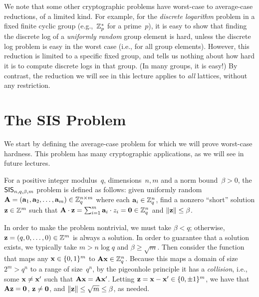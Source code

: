 \documentclass[11pt]{article}
\begin{document}
We note that some other cryptographic problems have worst-case to
average-case reductions, of a limited kind. For example, for the
\emph{discrete logarithm} problem in a fixed finite cyclic group
(e.g.,~$\mathbb{Z}_{p}^{*}$ for a prime~$p$), it is easy to show that finding
the discrete log of a \emph{uniformly random} group element is hard,
unless the discrete log problem is easy in the worst case (i.e., for
all group elements). However, this reduction is limited to a specific
fixed group, and tells us nothing about how hard it is to compute
discrete logs in that group. (In many groups, it is easy!) By
contrast, the reduction we will see in this lecture applies to
\emph{all} lattices, without any restriction.

\section{The SIS Problem}
\label{sec:sis-problem}

We start by defining the average-case problem for which we will prove
worst-case hardness. This problem has many cryptographic applications,
as we will see in future lectures.

\begin{definition}
  \label{def:sis-problem}
  For a positive integer modulus~$q$, dimensions~$n,m$ and a norm
  bound~$\beta > 0$, the $\mathsf{SIS}_{n,q,\beta,m}$ problem is defined as
  follows: given uniformly random
  $\mathbf{A} = (\mathbf{a}_{1}, \mathbf{a}_{2}, \ldots, \mathbf{a}_{m}) \in \mathbb{Z}_q^{n \times
    m}$ where each $\mathbf{a}_{i} \in \mathbb{Z}_q^{n}$, find a nonzero ``short''
  solution $\mathbf{z} \in \mathbb{Z}^{m}$ such that
  $\mathbf{A} \cdot \mathbf{z} = \sum_{i=1}^{m} \mathbf{a}_{i} \cdot z_{i} = \mathbf{0}
  \in \mathbb{Z}_q^{n}$ and $\lVert\mathbf{z}\rVert \leq \beta$.
\end{definition}

In order to make the problem nontrivial, we must take $\beta < q$;
otherwise, $\mathbf{z} = (q, 0, \ldots, 0) \in \mathbb{Z}^{m}$ is always a
solution. In order to guarantee that a solution exists, we typically
take $m > n \log q$ and $\beta \geq \sqrt{m}$. Then consider the
function that maps any $\mathbf{x} \in \{0,1\}^{m}$ to
$\mathbf{A} \mathbf{x} \in \mathbb{Z}_q^{n}$. Because this maps a domain of size
$2^{m} > q^{n}$ to a range of size~$q^{n}$, by the pigeonhole
principle it has a \emph{collision}, i.e., some $\mathbf{x} \neq \mathbf{x}'$
such that $\mathbf{A} \mathbf{x} = \mathbf{A} \mathbf{x}'$. Letting
$\mathbf{z} = \mathbf{x} - \mathbf{x}' \in \{0, \pm 1\}^{m}$, we have that
$\mathbf{A} \mathbf{z} = \mathbf{0}$, $\mathbf{z} \neq \mathbf{0}$, and
$\lVert\mathbf{z}\rVert \leq \sqrt{m} \leq \beta$, as needed.
\end{document}
